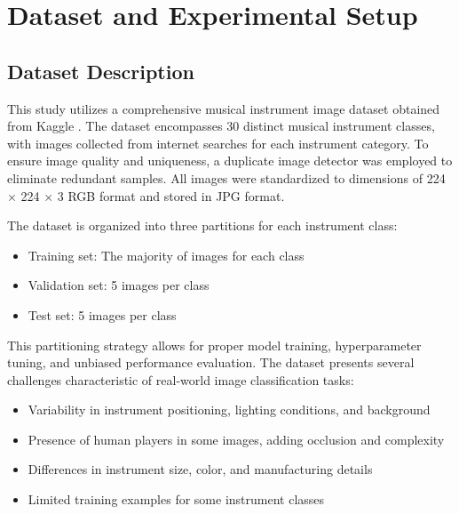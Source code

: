 
\section{Dataset and Experimental Setup}
\subsection{Dataset Description}
This study utilizes a comprehensive musical instrument image dataset obtained from Kaggle \cite{gpiosenka2021}. The dataset encompasses 30 distinct musical instrument classes, with images collected from internet searches for each instrument category. To ensure image quality and uniqueness, a duplicate image detector was employed to eliminate redundant samples. All images were standardized to dimensions of 224 × 224 × 3 RGB format and stored in JPG format.

The dataset is organized into three partitions for each instrument class:
\begin{itemize}
    \item Training set: The majority of images for each class
    \item Validation set: 5 images per class
    \item Test set: 5 images per class
\end{itemize}

This partitioning strategy allows for proper model training, hyperparameter tuning, and unbiased performance evaluation. The dataset presents several challenges characteristic of real-world image classification tasks:
\begin{itemize}
    \item Variability in instrument positioning, lighting conditions, and background
    \item Presence of human players in some images, adding occlusion and complexity
    \item Differences in instrument size, color, and manufacturing details
    \item Limited training examples for some instrument classes
\end{itemize}


